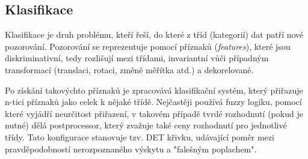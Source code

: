 \documentclass[10pt,a4paper,titlepage]{article}
\begin{document}
  \subsection*{Klasifikace}
  Klasifikace je druh problému, kteří řeší, do které z tříd (kategorií) dat patří nové pozorování.
  Pozorování se reprezentuje pomocí příznaků ({\it features}), které jsou
  diskriminativní, tedy rozlišují mezi třídami, invariantní vůči případným transformací (translaci,
  rotaci, změně měřítka atd.) a dekorelované. 

  Po získání takovýchto příznaků je zpracovává klasifikační systém, který přiřazuje n-tici příznaků
  jako celek k nějaké třídě. Nejčastěji používá fuzzy logiku, pomocí které vyjádří neurčitost přiřazení,
  v takovém případě tvrdé rozhodnutí (pokud je nutné) dělá postprocessor, který zvažuje také ceny
  rozhodnutí pro jednotlivé třídy. Tato konfigurace stanovuje tzv. DET křivku, udávající poměr mezi
  pravděpodobností nerozpoznaného výskytu a "falešným poplachem". \cite{IKRclassification}




  
  \printbibliography
\end{document}
